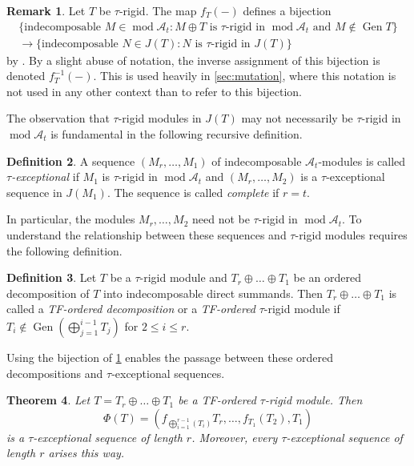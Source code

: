 \documentclass[10pt,twoside, a4paper,reqno]{amsart}
\DeclareMathOperator{\mods}{mod}
\DeclareMathOperator{\Gen}{Gen}
\newcommand{\A}{\mathscr{A}}
\newtheorem{theorem}{Theorem}[section]
\theoremstyle{definition}
\newtheorem{definition}[theorem]{Definition}
\newtheorem{remark}[theorem]{Remark}
\begin{document}
\begin{remark}\label{rmk:notationjustification}
    Let $T$ be $\tau$-rigid. The map $f_T(-)$ defines a bijection 
    \begin{align*} \{ \text{indecomposable } M \in \mods \A_t : M \oplus T \text{ is $\tau$-rigid in $\mods \A_t$ and } M \not \in \Gen T \} \\
    \to \{\text{indecomposable } N \in J(T) : N \text{ is $\tau$-rigid in $J(T)$}\}
     \end{align*}
     by \cite[Prop. 4.5]{BuanMarsh2018t}. By a slight abuse of notation, the inverse assignment of this bijection is denoted $f_T^{-1}(-)$. This is used heavily in \cref{sec:mutation}, where this notation is not used in any other context than to refer to this bijection.
\end{remark}

The observation that $\tau$-rigid modules in $J(T)$ may not necessarily be $\tau$-rigid in $\mods \A_t$ is fundamental in the following recursive definition. 
\begin{definition}\cite[Def. 1.3]{BuanMarsh2018t}
	A sequence $(M_r, \dots, M_1)$ of indecomposable $\A_t$-modules is called \textit{$\tau$-exceptional} if $M_1$ is $\tau$-rigid in $\mods \A_t$ and $(M_r, \dots, M_{2})$ is a $\tau$-exceptional sequence in $J(M_1)$. The sequence is called \textit{complete} if $r=t$.
\end{definition}

In particular, the modules $M_r, \dots, M_2$ need not be $\tau$-rigid in $\mods \A_t$. To understand the relationship between these sequences and $\tau$-rigid modules requires the following definition.



\begin{definition}
    Let $T$ be a $\tau$-rigid module and $T_r \oplus \dots \oplus T_1$ be an ordered decomposition of $T$ into indecomposable direct summands. Then $T_r \oplus \dots \oplus T_1$ is called a \textit{TF-ordered decomposition} or a \textit{TF-ordered} $\tau$-rigid module if $T_i \not \in \Gen (\bigoplus_{j=1}^{i-1} T_j)$ for $2 \leq i \leq r$.
\end{definition}

Using the bijection of \cref{rmk:notationjustification} enables the passage between these ordered decompositions and $\tau$-exceptional sequences. 



\begin{theorem}\cite[Thm. 5.1]{MendozaTreffinger}\label{thm:MendozaTreff}
    Let $T = T_r \oplus \dots \oplus T_1$ be a TF-ordered $\tau$-rigid module. Then 
    \[ \Phi(T) = \left(f_{\bigoplus_{i=1}^{r-1}(T_i)} T_r ,\dots,f_{T_1} (T_2), T_1 \right)\]
    is a $\tau$-exceptional sequence of length $r$. Moreover, every $\tau$-exceptional sequence of length $r$ arises this way. 
\end{theorem}
\end{document}
